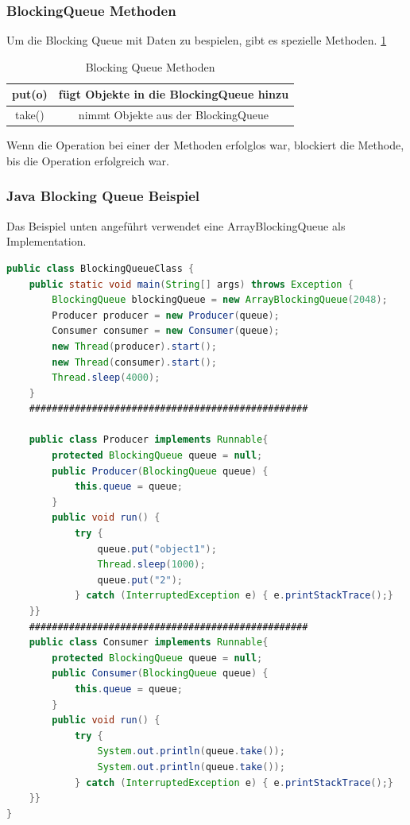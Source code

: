 \subsubsection{BlockingQueue Methoden}
Um die Blocking Queue mit Daten zu bespielen, gibt es spezielle Methoden. \ref{tab:allgemein:blockingQueueMethoden}
 
\begin{table}
    \centering
    \begin{tabular}{ |c|c| }
     \hline
     put(o) & fügt Objekte in die BlockingQueue hinzu \\
     \hline
     take() & nimmt Objekte aus der BlockingQueue \\
     \hline
    \end{tabular}
    \caption{Blocking Queue Methoden \cite{javaBlockingQueue}}
    \label{tab:allgemein:blockingQueueMethoden}
\end{table}

Wenn die Operation bei einer der Methoden erfolglos war, blockiert die Methode, bis die Operation erfolgreich war. \cite{javaBlockingQueue}
 
\subsubsection{Java Blocking Queue Beispiel}
Das Beispiel unten angeführt verwendet eine ArrayBlockingQueue als Implementation.
 
 
 
\begin{lstlisting}[language=java,caption=Java BlockingQueue Beispiel,label=lst:impl:blockingQueue]
    public class BlockingQueueClass {
    public static void main(String[] args) throws Exception {
        BlockingQueue blockingQueue = new ArrayBlockingQueue(2048);
        Producer producer = new Producer(queue);
        Consumer consumer = new Consumer(queue);
        new Thread(producer).start();
        new Thread(consumer).start();
        Thread.sleep(4000);
    }
    #################################################
 
    public class Producer implements Runnable{
        protected BlockingQueue queue = null;
        public Producer(BlockingQueue queue) {
            this.queue = queue;
        }
        public void run() {
            try {
                queue.put("object1");
                Thread.sleep(1000);
                queue.put("2");
            } catch (InterruptedException e) { e.printStackTrace();}
    }}
    #################################################
    public class Consumer implements Runnable{
        protected BlockingQueue queue = null;
        public Consumer(BlockingQueue queue) {
            this.queue = queue;
        }
        public void run() {
            try {
                System.out.println(queue.take());
                System.out.println(queue.take());
            } catch (InterruptedException e) { e.printStackTrace();}
    }}
}
\end{lstlisting}
\cite{javaBlockingQueue}
 
